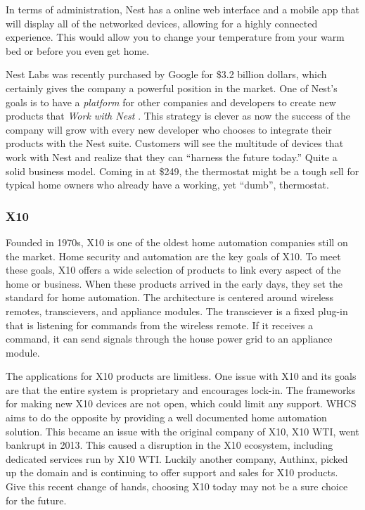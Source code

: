 In terms of administration, Nest has a online web interface and a mobile app
that will display all of the networked devices, allowing for a highly connected
experience. This would allow you to change your temperature from your warm bed
or before you even get home.

Nest Labs was recently purchased by Google for \$3.2 billion dollars\cite{link20},
which certainly gives the company a powerful position in the market. One of
Nest's goals is to have a \emph{platform} for other companies and developers to
create new products that \emph{Work with Nest \texttrademark}\cite{link21}. This strategy is
clever as now the success of the company will grow with every new
developer who chooses to integrate their products with the Nest suite.
Customers will see the multitude of devices that work with Nest and realize
that they can ``harness the future today.'' Quite a solid business model.
Coming in at \$249, the thermostat might be a tough sell for typical home owners who
already have a working, yet ``dumb'', thermostat.

\subsubsection{X10}
Founded in 1970s, X10 is one of the oldest home automation companies still on
the market.  Home security and automation are the key goals of X10. To meet
these goals, X10 offers a wide selection of products to link every aspect of
the home or business. When these products arrived in the early days, they set
the standard for home automation. The architecture is centered around wireless
remotes, transcievers, and appliance modules.  The transciever is a fixed
plug-in that is listening for commands from the wireless remote. If it receives
a command, it can send signals through the house power grid to an appliance
module.

The applications for X10 products are limitless. One issue with X10 and its
goals are that the entire system is proprietary and encourages lock-in. The
frameworks for making new X10 devices are not open, which could limit any
support. WHCS aims to do the opposite by providing a well documented home automation solution.
This became an issue with the original company of X10, X10 WTI, went
bankrupt in 2013. This caused a disruption in the X10 ecosystem, including
dedicated services run by X10 WTI. Luckily another company, Authinx, picked up
the domain\cite{link1} and is continuing to offer support and sales for
X10 products. Give this recent change of hands, choosing X10 today may not be a
sure choice for the future.
